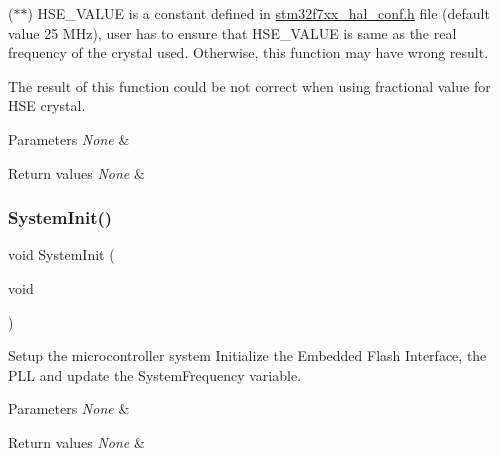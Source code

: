 ($\ast$$\ast$) H\+S\+E\+\_\+\+V\+A\+L\+UE is a constant defined in \mbox{\hyperlink{stm32f7xx__hal__conf_8h_source}{stm32f7xx\+\_\+hal\+\_\+conf.\+h}} file (default value 25 M\+Hz), user has to ensure that H\+S\+E\+\_\+\+V\+A\+L\+UE is same as the real frequency of the crystal used. Otherwise, this function may have wrong result.


\begin{DoxyItemize}
\item The result of this function could be not correct when using fractional value for H\+SE crystal.
\end{DoxyItemize}


\begin{DoxyParams}{Parameters}
{\em None} & \\
\hline
\end{DoxyParams}

\begin{DoxyRetVals}{Return values}
{\em None} & \\
\hline
\end{DoxyRetVals}
\mbox{\label{group___s_t_m32_f7xx___system___private___functions_ga93f514700ccf00d08dbdcff7f1224eb2}} 
\subsubsection{\texorpdfstring{SystemInit()}{SystemInit()}}
{\footnotesize\ttfamily void System\+Init (\begin{DoxyParamCaption}\item[{void}]{ }\end{DoxyParamCaption})}



Setup the microcontroller system Initialize the Embedded Flash Interface, the P\+LL and update the System\+Frequency variable. 


\begin{DoxyParams}{Parameters}
{\em None} & \\
\hline
\end{DoxyParams}

\begin{DoxyRetVals}{Return values}
{\em None} & \\
\hline
\end{DoxyRetVals}
